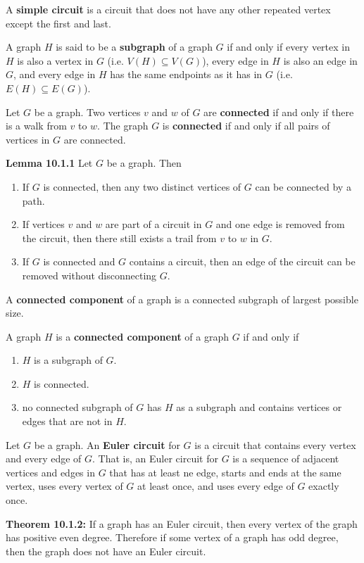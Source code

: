 \documentclass[11pt]{article}
\begin{document}
\bigskip
A {\bf simple circuit} is a circuit that does not have any other repeated vertex 
except the first and last. 

\bigskip
A graph $H$ is said to be a {\bf subgraph} of a graph $G$ if and only if every 
vertex in $H$ is also a vertex in $G$ (i.e. $V(H) \subseteq V(G)$), every 
edge in $H$ is also an edge in $G$, and every edge in $H$ has the same endpoints 
as it has in $G$ (i.e. $E(H) \subseteq E(G)$). 

\bigskip
Let $G$ be a graph. Two vertices $v$ and $w$ of $G$ are {\bf connected} if and 
only if there is a walk from $v$ to $w$. The graph $G$ is {\bf connected } if and only if 
all pairs of vertices in $G$ are connected. 

\bigskip
{\bf Lemma 10.1.1} Let $G$ be a graph. Then 
\begin{enumerate}[label=\alph*.]
    \item If $G$ is connected, then any two distinct vertices of $G$ can be 
    connected by a path. 
    \item If vertices $v$ and $w$ are part of a circuit in $G$ and one edge is 
    removed from the circuit, then there still exists a trail from $v$ to $w$ 
    in $G$. 
    \item If $G$ is connected and $G$ contains a circuit, then an edge of the 
    circuit can be removed without disconnecting $G$. 
\end{enumerate}

\bigskip
A {\bf connected component} of a graph is a connected subgraph of largest possible 
size. 

\bigskip 
A graph $H$ is a {\bf connected component} of a graph $G$ if and only if 
\begin{enumerate}
    \item $H$ is a subgraph of $G$.
    \item $H$ is connected. 
    \item no connected subgraph of $G$ has $H$ as a subgraph and contains 
    vertices or edges that are not in $H$. 
\end{enumerate}

\bigskip
Let $G$ be a graph. An {\bf Euler circuit} for $G$ is a circuit that contains 
every vertex and every edge of $G$. That is, an Euler circuit for $G$ is a sequence 
of adjacent vertices and edges in $G$ that has at least ne edge, starts and ends 
at the same vertex, uses every vertex of $G$ at least once, and uses every edge of 
$G$ exactly once. 

\bigskip
{\bf Theorem 10.1.2:} If a graph has an Euler circuit, then every vertex of the 
graph has positive even degree. Therefore if some vertex of a graph has odd 
degree, then the graph does not have an Euler circuit. 
\end{document}
